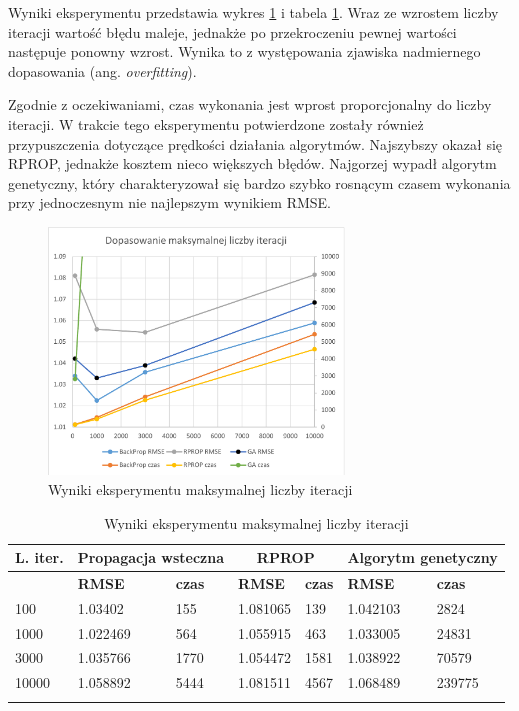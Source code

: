 \documentclass[twoside]{iisthesis}
\begin{document}
			Wyniki eksperymentu przedstawia wykres \ref{fig:expiterations} i tabela \ref{tab:expiterations}. Wraz ze wzrostem liczby iteracji wartość błędu maleje, jednakże po przekroczeniu pewnej wartości następuje ponowny wzrost. Wynika to z występowania zjawiska nadmiernego dopasowania (ang. \textit{overfitting}). 
			
			Zgodnie z oczekiwaniami, czas wykonania jest wprost proporcjonalny do liczby iteracji. W trakcie tego eksperymentu potwierdzone zostały również przypuszczenia dotyczące prędkości działania algorytmów. Najszybszy okazał się RPROP, jednakże kosztem nieco większych błędów. Najgorzej wypadł algorytm genetyczny, który charakteryzował się bardzo szybko rosnącym czasem wykonania przy jednoczesnym nie najlepszym wynikiem RMSE. 
			
			\begin{figure}[!ht]
				\centering
				\includegraphics[width=0.7\textwidth]{expiterations}			
				\caption{Wyniki eksperymentu maksymalnej liczby iteracji}
				\label{fig:expiterations}
			\end{figure}
			

			\begin{longtable}{l||ll|ll|ll}		
				\label{tab:expiterations}		
				\textbf{L. iter.} & \multicolumn{2}{c|}{\textbf{Propagacja wsteczna}}  & \multicolumn{2}{c|}{\textbf{RPROP}} & \multicolumn{2}{c}{\textbf{Algorytm genetyczny}}  \\
				\hline
				& \textbf{RMSE} & \textbf{czas} & \textbf{RMSE} & \textbf{czas} & \textbf{RMSE} & \textbf{czas} \\
				\hline
				100 & 1.03402 & 155 & 1.081065 & 139 & 1.042103 & 2824 \\
				1000  & 1.022469 & 564 & 1.055915 & 463 & 1.033005 & 24831  \\
				3000  & 1.035766 & 1770 & 1.054472 & 1581  & 1.038922 & 70579  \\
				10000 & 1.058892  & 5444 & 1.081511  & 4567  & 1.068489 & 239775 \\
				\caption{Wyniki eksperymentu maksymalnej liczby iteracji}
			\end{longtable}
		
\end{document}
